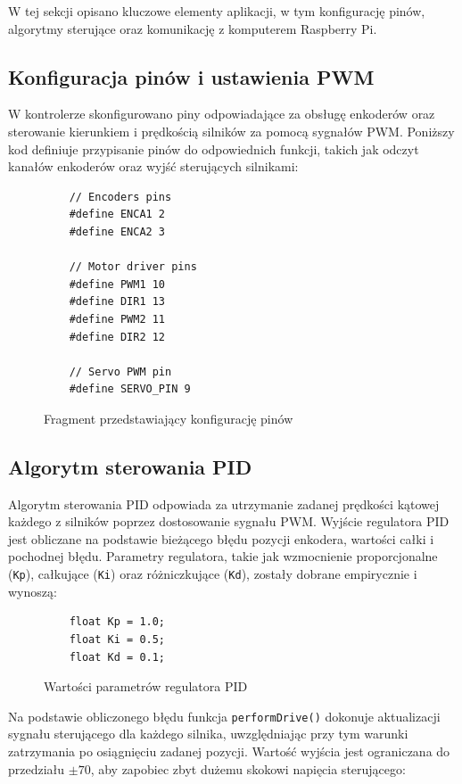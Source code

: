 W tej sekcji opisano kluczowe elementy aplikacji, w tym konfigurację pinów, algorytmy sterujące oraz komunikację z komputerem Raspberry Pi.

\subsection{Konfiguracja pinów i ustawienia PWM}

W kontrolerze skonfigurowano piny odpowiadające za obsługę enkoderów oraz sterowanie kierunkiem i prędkością silników za pomocą sygnałów PWM. Poniższy kod definiuje przypisanie pinów do odpowiednich funkcji, takich jak odczyt kanałów enkoderów oraz wyjść sterujących silnikami:

\begin{figure}[H]
  \centering
  \begin{lstlisting}
    // Encoders pins
    #define ENCA1 2 
    #define ENCA2 3 
    
    // Motor driver pins
    #define PWM1 10
    #define DIR1 13
    #define PWM2 11
    #define DIR2 12
    
    // Servo PWM pin
    #define SERVO_PIN 9
  \end{lstlisting}
  \caption{Fragment przedstawiający konfigurację pinów}
  \label{fig:config}
\end{figure}

\subsection{Algorytm sterowania PID}

Algorytm sterowania PID odpowiada za utrzymanie zadanej prędkości kątowej każdego z silników poprzez dostosowanie sygnału PWM. Wyjście regulatora PID jest obliczane na podstawie bieżącego błędu pozycji enkodera, wartości całki i pochodnej błędu. Parametry regulatora, takie jak wzmocnienie proporcjonalne (\texttt{Kp}), całkujące (\texttt{Ki}) oraz różniczkujące (\texttt{Kd}), zostały dobrane empirycznie i wynoszą:

\begin{figure}[H]
  \centering
  \begin{lstlisting}
    float Kp = 1.0; 
    float Ki = 0.5; 
    float Kd = 0.1; 
  \end{lstlisting}
  \caption{Wartości parametrów regulatora PID}
  \label{fig:config-pid}
  \end{figure}

Na podstawie obliczonego błędu funkcja \texttt{performDrive()} dokonuje aktualizacji sygnału sterującego dla każdego silnika, uwzględniając przy tym warunki zatrzymania po osiągnięciu zadanej pozycji. Wartość wyjścia jest ograniczana do przedziału \( \pm 70 \), aby zapobiec zbyt dużemu skokowi napięcia sterującego:

